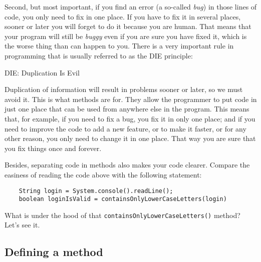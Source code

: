 Second, but most important, if you find an error (a so-called
\emph{bug}) in those lines of code, you only need to fix in one
place. If you have to fix it in several places, sooner or later you
will forget to do it because you are human. That means that your
program will still be \emph{buggy} even if you are sure you have fixed
it, which is the worse thing than can happen to you. There is a very
important rule in programming that is usually referred to as the DIE
principle: 

{\large DIE: Duplication Is Evil}

Duplication of information will result in problems sooner or later, so
we must avoid it. This is what methods are for. They allow the
programmer to put code in just one place that can be used from
anywhere else in the program. This means that, for example, if you
need to fix a bug, you fix it in only one place; and if you need to
improve the code to add a new feature, or to make it faster, or for
any other reason, you only need to change it in one place. That way
you are sure that you fix things once and forever. 

Besides, separating code in methods also makes your code
clearer. Compare the easiness of reading the code above with the
following statement: 

\begin{verbatim}
    String login = System.console().readLine();
    boolean loginIsValid = containsOnlyLowerCaseLetters(login)
\end{verbatim}

What is under the hood of that \verb+containsOnlyLowerCaseLetters()+
method? Let's see it. 

\subsection{Defining a method}







